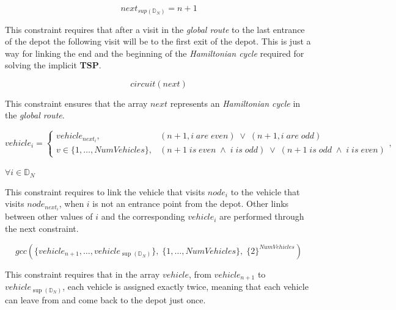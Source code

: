 \documentclass[../main.tex]{subfiles}
\begin{document}
\begin{center}
    \begin{equation}
        next_{sup(\mathbb{D}_N)} = n+1
    \end{equation}
\end{center}
This constraint requires that after a visit in the \textit{global route} to the last entrance of the depot the following visit will be to the first exit of the depot. This is just a way for linking the end and the beginning of the \textit{Hamiltonian cycle} required for solving the implicit \textbf{TSP}.

\begin{center}
    \begin{equation}
        circuit(next)
    \end{equation}
\end{center}
This constraint ensures that the array $next$ represents an \textit{Hamiltonian cycle} in the \textit{global route}.

\begin{center}
    \begin{equation}
        vehicle_i =
        \begin{cases}
            vehicle_{next_i}, & (\text{$n+1, i$} \; are \; even) \; \vee \; (\text{$n+1, i$} \; are \; odd)\\
            \text{$v \in \{1,\dots,NumVehicles\}$}, & (\text{$n+1$} \; is \; even \; \wedge \; \text{$i$} \; is \; odd ) \; \vee \; (\text{$n+1$} \; is \; odd \; \wedge \; \text{$i$} \; is \; even )
        \end{cases},
    \end{equation}\\
    \begin{math}
        \forall i \in \mathbb{D}_N
    \end{math}
\end{center}
This constraint requires to link the vehicle that visits $node_i$ to the vehicle that visits $node_{next_i}$, when $i$ is not an entrance point from the depot.
Other links between other values of $i$ and the corresponding $vehicle_i$ are performed through the next constraint.

\begin{center}
    \begin{equation}
        gcc(\{vehicle_{n+1},\dots,vehicle_{\sup{}(\mathbb{D}_N)}\}, \; \{1,\dots,NumVehicles\}, \; \{2\}^{NumVehicles})
    \end{equation}
\end{center}
This constraint requires that in the array $vehicle$, from $vehicle_{n+1}$ to $vehicle_{\sup{}(\mathbb{D}_N)}$, each vehicle is assigned exactly twice, meaning that each vehicle can leave from and come back to the depot just once.
\end{document}
